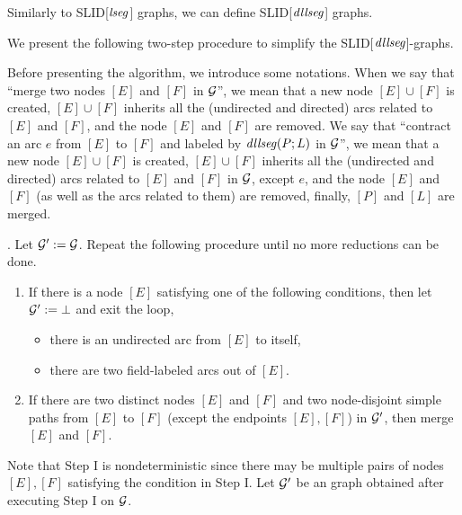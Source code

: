 \documentclass{llncs}
\begin{document}
Similarly to SLID[$\mathit{lseg}$] graphs, we can define SLID[$\mathit{dllseg}$] graphs.

We present the following two-step procedure to simplify the SLID[$\mathit{dllseg}$]-graphs.

Before presenting the algorithm, we introduce some notations. When we say that ``merge two nodes $[E]$ and $[F]$ in $\mathcal{G}$'', we mean that a new node $[E] \cup [F]$ is created, $[E] \cup [F]$ inherits all the (undirected and directed) arcs related to $[E]$ and $[F]$, and the node $[E]$ and $[F]$ are removed. We say that ``contract an arc $e$ from $[E]$ to $[F]$ and labeled by $\mathit{dllseg}(P;L)$ in $\mathcal{G}$'', we mean that a new node $[E] \cup [F]$ is created, $[E] \cup [F]$ inherits all the (undirected and directed) arcs related to $[E]$ and $[F]$ in $\mathcal{G}$, except $e$, and the node $[E]$ and $[F]$ (as well as the arcs related to them) are removed, finally, $[P]$ and $[L]$ are merged.


\smallskip
{}. Let $\mathcal{G}':=\mathcal{G}$. Repeat the following procedure until no more reductions can be done.
\begin{enumerate}
\item If there is a node $[E]$ satisfying one of the following conditions, then let $\mathcal{G}':=\bot$ and exit the loop,
\begin{itemize}
\item there is an undirected arc from $[E]$ to itself,
%
\item there are two field-labeled arcs out of $[E]$.
\end{itemize}
%
\item If there are two distinct nodes $[E]$ and $[F]$ and two node-disjoint simple paths from $[E]$ to $[F]$ (except the endpoints $[E],[F]$) in $\mathcal{G}'$, then merge $[E]$ and $[F]$.
\end{enumerate}
Note that Step I is nondeterministic since there may be multiple pairs of nodes $[E],[F]$ satisfying the condition in Step I.
Let $\mathcal{G}'$ be an graph obtained after executing Step I on $\mathcal{G}$.
\end{document}

